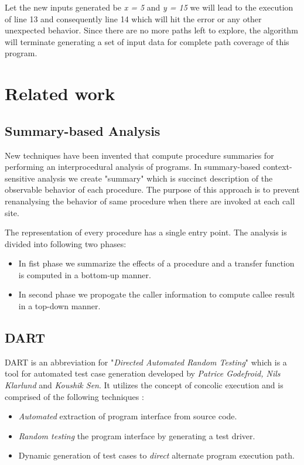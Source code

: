 \documentclass[12pt,oneside]{book}
\begin{document}
Let the new inputs generated be \textit{x = 5} and \textit{y = 15} we will lead to the execution of line 13 and consequently line 14 which will hit the error or any other unexpected behavior. Since there are no more paths left to explore, the algorithm will terminate generating a set of input data for complete path coverage of this program.


\section {Related work}


\subsection {Summary-based Analysis}
New techniques have been invented that compute procedure summaries for performing an interprocedural analysis of programs. In summary-based context-sensitive analysis we create "summary"\cite{ipa1} which is succinct description of the observable behavior of each procedure. The purpose of this approach is to prevent renanalysing the behavior of same procedure when there are invoked at each call site.

The representation of every procedure has a single entry point. The analysis is divided into following two phases:
\begin{itemize}
  \item In fist phase we summarize the effects of a procedure and a transfer function is computed in a bottom-up manner.
  \item  In second phase we propogate the caller information to compute callee result in a top-down manner.
\end{itemize}


\subsection {DART}
DART is an abbreviation for "\textit{Directed Automated Random Testing}"\cite{dart} which is a tool for automated test case generation developed by \textit{Patrice Godefroid, Nils Klarlund} and \textit{Koushik Sen}. It utilizes the concept of concolic execution and is comprised of the following techniques :
\begin{itemize}
 \item \textit{Automated} extraction of program interface from source code.
 \item \textit{Random testing} the program interface by generating a test driver. 
 \item Dynamic generation of test cases to \textit{direct} alternate program execution path.
\end{itemize}
\end{document}
